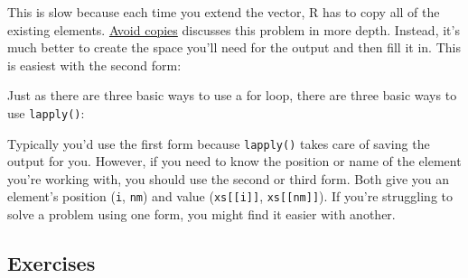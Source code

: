 This is slow because each time you extend the vector, R has to copy all
of the existing elements. \protect\hyperlink{avoid-copies}{Avoid copies}
discusses this problem in more depth. Instead, it's much better to
create the space you'll need for the output and then fill it in. This is
easiest with the second form: 

\begin{Shaded}
\begin{Highlighting}[]
\StringTok{ }\NormalTok{(}
 
\StringTok{ }
\NormalTok{\}}
\end{Highlighting}
\end{Shaded}

Just as there are three basic ways to use a for loop, there are three
basic ways to use \texttt{lapply()}:

\begin{Shaded}
\begin{Highlighting}[]
\NormalTok{(}
\NormalTok{(}
\end{Highlighting}
\end{Shaded}

Typically you'd use the first form because \texttt{lapply()} takes care
of saving the output for you. However, if you need to know the position
or name of the element you're working with, you should use the second or
third form. Both give you an element's position (\texttt{i},
\texttt{nm}) and value (\texttt{xs{[}{[}i{]}{]}},
\texttt{xs{[}{[}nm{]}{]}}). If you're struggling to solve a problem
using one form, you might find it easier with another.

\hypertarget{exercises}{%
\subsection{Exercises}\label{exercises}}

